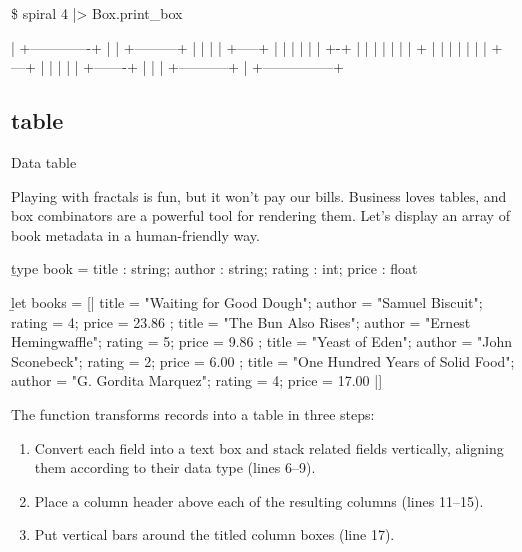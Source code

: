 \documentclass{article}
\begin{document}
\begin{code}[text]
\$ spiral 4 |> Box.print_box

| +-------------+
| | +---------+ |
| | | +-----+ | |
| | | | +-+ | | |
| | | | + | | | |
| | | +---+ | | |
| | +-------+ | |
| +-----------+ |
+---------------+
\end{code}

\subsection{table}{Data table}

Playing with fractals is fun, but it won't pay our bills.
Business loves tables, and box combinators are a powerful tool for rendering them.
Let's display an array of book metadata in a human-friendly way.

\begin{code}[ocaml]
\b{type} book = { title : string;
              author : string;
              rating : int;
              price : float }

\b{let} books = [| { title = "Waiting for Good Dough";
                 author = "Samuel Biscuit";
                 rating = 4;
                 price = 23.86 };
               { title = "The Bun Also Rises";
                 author = "Ernest Hemingwaffle";
                 rating = 5;
                 price = 9.86 };
               { title = "Yeast of Eden";
                 author = "John Sconebeck";
                 rating = 2;
                 price = 6.00 };
               { title = "One Hundred Years of Solid Food";
                 author = "G. Gordita Marquez";
                 rating = 4;
                 price = 17.00 }
             |]
\end{code}

The \href{#ref-make-table}{} function transforms records into a table in three steps:
\begin{enumerate}
\item Convert each field into a text box and stack related fields vertically, aligning them according to their data type (lines 6--9).
\item Place a column header above each of the resulting columns (lines 11--15).
\item Put vertical bars around the titled column boxes (line 17).
\end{enumerate}
\end{document}
